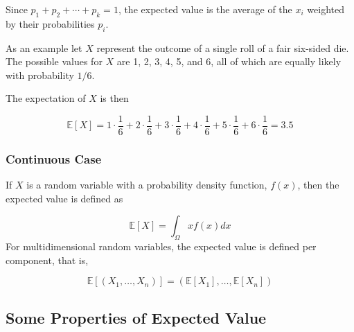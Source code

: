 Since $p_{1}+p_{2}+\cdots +p_{k}=1$, the expected value is the average of the $x_{i}$ weighted by their probabilities $p_{i}$.

As an example let $X$ represent the outcome of a single roll of a fair six-sided die. The possible values for $X$ are 1, 2, 3, 4, 5, and 6, all of which are equally likely with probability $1/6$.

The expectation of $X$ is then

\begin{equation*}
\mathbb{E}[X]=1\cdot {\frac {1}{6}}+2\cdot {\frac {1}{6}}+3\cdot {\frac {1}{6}}+4\cdot {\frac {1}{6}}+5\cdot {\frac {1}{6}}+6\cdot {\frac {1}{6}}=3.5
\end{equation*}

\subsubsection{Continuous Case}
If $X$ is a random variable with a probability density function, $f(x)$, then the expected value is defined as

\begin{equation}
\mathbb{E}[X]=\int_{\Omega}xf(x)dx
\end{equation}
For multidimensional random variables, the expected value is defined per component, that is,

\begin{equation}
\mathbb{E}[(X_{1},\ldots ,X_{n})]=(\mathbb{E} [X_{1}],\ldots ,\mathbb{E}[X_{n}])
\end{equation}

\subsection{Some Properties of Expected Value}
\label{some-properties}

